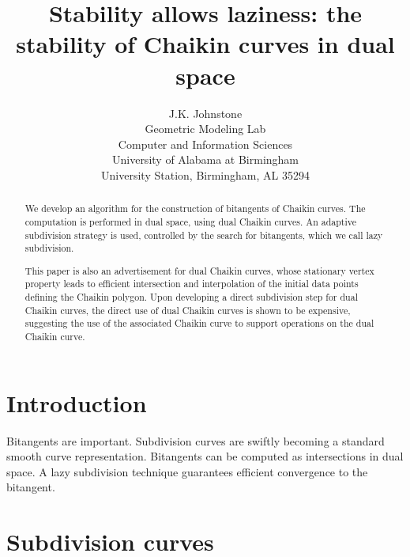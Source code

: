 \documentclass[12pt]{article}
\title{Stability allows laziness: the stability of Chaikin curves in dual space}
\author{J.K. Johnstone\\
	Geometric Modeling Lab\\
	Computer and Information Sciences\\
	University of Alabama at Birmingham\\
	University Station, Birmingham, AL 35294}
\begin{document}
\maketitle

\begin{abstract}
We develop an algorithm for the construction of bitangents of Chaikin curves.
The computation is performed in dual space, using dual Chaikin curves.
An adaptive subdivision strategy is used, controlled by the search
for bitangents, which we call lazy subdivision.

This paper is also an advertisement for dual Chaikin curves,
whose stationary vertex property leads to efficient intersection
and interpolation of the initial data points defining the Chaikin polygon.
Upon developing a direct subdivision step for dual Chaikin curves,
the direct use of dual Chaikin curves is shown to be expensive, 
suggesting the use of the associated Chaikin curve to support operations
on the dual Chaikin curve.
\end{abstract} 

\clearpage


\section{Introduction}

Bitangents are important.
Subdivision curves are swiftly becoming a standard smooth curve representation.
Bitangents can be computed as intersections in dual space.
A lazy subdivision technique guarantees efficient convergence to the bitangent.


\section{Subdivision curves}
\end{document}
